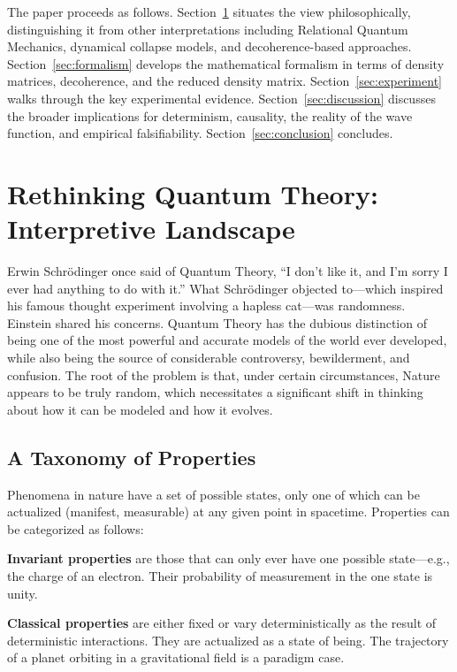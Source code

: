 \documentclass[11pt,a4paper]{article}
\theoremstyle{plain}
\theoremstyle{definition}
\theoremstyle{remark}
\begin{document}
The paper proceeds as follows. Section~\ref{sec:landscape} situates the view
philosophically, distinguishing it from other interpretations including Relational
Quantum Mechanics, dynamical collapse models, and decoherence-based approaches.
Section~\ref{sec:formalism} develops the mathematical formalism in terms of
density matrices, decoherence, and the reduced density matrix.
Section~\ref{sec:experiment} walks through the key experimental evidence.
Section~\ref{sec:discussion} discusses the broader implications for determinism,
causality, the reality of the wave function, and empirical falsifiability.
Section~\ref{sec:conclusion} concludes.

\section{Rethinking Quantum Theory: Interpretive Landscape}
\label{sec:landscape}

Erwin Schr\"{o}dinger once said of Quantum Theory, ``I don't like it, and I'm
sorry I ever had anything to do with it.'' What Schr\"{o}dinger objected
to---which inspired his famous thought experiment involving a hapless cat---was
randomness. Einstein shared his concerns. Quantum Theory has the dubious
distinction of being one of the most powerful and accurate models of the world
ever developed, while also being the source of considerable controversy,
bewilderment, and confusion. The root of the problem is that, under certain
circumstances, Nature appears to be truly random, which necessitates a significant
shift in thinking about how it can be modeled and how it evolves.

\subsection{A Taxonomy of Properties}

Phenomena in nature have a set of possible states, only one of which can be
actualized (manifest, measurable) at any given point in spacetime. Properties can
be categorized as follows:

\textbf{Invariant properties} are those that can only ever have one possible
state---e.g., the charge of an electron. Their probability of measurement in the
one state is unity.

\textbf{Classical properties} are either fixed or vary deterministically as the
result of deterministic interactions. They are actualized as a state of being. The
trajectory of a planet orbiting in a gravitational field is a paradigm case.
\end{document}
